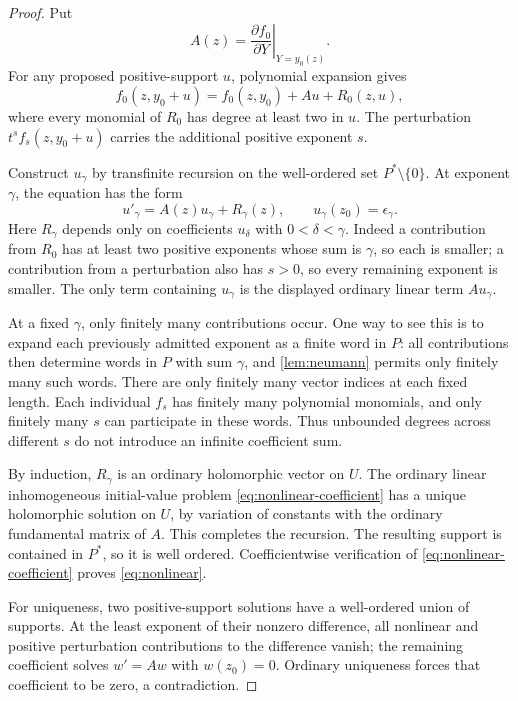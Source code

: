 \documentclass[11pt,letterpaper]{article}
\numberwithin{equation}{section}
\theoremstyle{definition}
\theoremstyle{remark}
\begin{document}
\begin{proof}
Put
\[
 A(z)=\left.\frac{\partial f_0}{\partial Y}\right|_{Y=y_0(z)}.
\]
For any proposed positive-support $u$, polynomial expansion gives
\[
 f_0(z,y_0+u)=f_0(z,y_0)+Au+R_0(z,u),
\]
where every monomial of $R_0$ has degree at least two in $u$.
The perturbation $t^sf_s(z,y_0+u)$ carries the additional positive
exponent $s$.

Construct $u_\gamma$ by transfinite recursion on the well-ordered set
$P^*\setminus\{0\}$. At exponent $\gamma$, the equation has the form
\begin{equation}\label{eq:nonlinear-coefficient}
 u'_\gamma=A(z)u_\gamma+R_\gamma(z),
 \qquad u_\gamma(z_0)=\epsilon_\gamma.
\end{equation}
Here $R_\gamma$ depends only on coefficients $u_\delta$ with
$0<\delta<\gamma$. Indeed a contribution from $R_0$ has at least two
positive exponents whose sum is $\gamma$, so each is smaller; a contribution
from a perturbation also has $s>0$, so every remaining exponent is smaller.
The only term containing $u_\gamma$ is the displayed ordinary linear
term $Au_\gamma$.

At a fixed $\gamma$, only finitely many contributions occur. One way to see
this is to expand each previously admitted exponent as a finite word in
$P$: all contributions then determine words in $P$ with sum $\gamma$,
and \cref{lem:neumann} permits only finitely many such words. There are
only finitely many vector indices at each fixed length. Each individual
$f_s$ has finitely many polynomial monomials, and only finitely many
$s$ can participate in these words. Thus unbounded degrees across different
$s$ do not introduce an infinite coefficient sum.

By induction, $R_\gamma$ is an ordinary holomorphic vector on $U$.
The ordinary linear inhomogeneous initial-value problem
\eqref{eq:nonlinear-coefficient} has a unique holomorphic solution on $U$,
by variation of constants with the ordinary fundamental matrix of $A$.
This completes the recursion. The resulting support is contained in $P^*$,
so it is well ordered. Coefficientwise verification of
\eqref{eq:nonlinear-coefficient} proves \eqref{eq:nonlinear}.

For uniqueness, two positive-support solutions have a well-ordered union of
supports. At the least exponent of their nonzero difference, all nonlinear
and positive perturbation contributions to the difference vanish; the
remaining coefficient solves $w'=Aw$ with $w(z_0)=0$. Ordinary uniqueness
forces that coefficient to be zero, a contradiction.
\end{proof}
\end{document}
